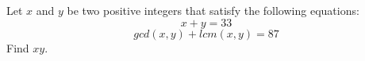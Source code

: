 Let $x$ and $y$ be two positive integers that satisfy the following equations: \[x + y = 33\]\[gcd(x, y) + lcm(x, y) = 87\]Find $xy$.
